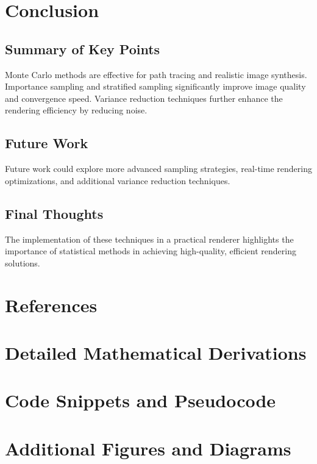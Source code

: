 \documentclass[12pt]{article}
\begin{document}
\section{Conclusion}
\label{sec:conclusion}
\subsection{Summary of Key Points}
Monte Carlo methods are effective for path tracing and realistic image synthesis. Importance sampling and stratified sampling significantly improve image quality and convergence speed. Variance reduction techniques further enhance the rendering efficiency by reducing noise.
\subsection{Future Work}
Future work could explore more advanced sampling strategies, real-time rendering optimizations, and additional variance reduction techniques.
\subsection{Final Thoughts}
The implementation of these techniques in a practical renderer highlights the importance of statistical methods in achieving high-quality, efficient rendering solutions.

\section{References}
\label{sec:references}



\appendix
\section{Detailed Mathematical Derivations}
\section{Code Snippets and Pseudocode}
\section{Additional Figures and Diagrams}
\end{document}
